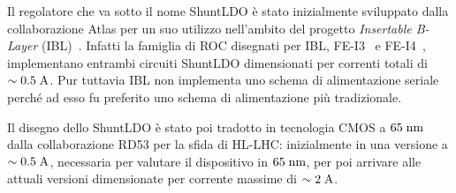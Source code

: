 
Il regolatore che va sotto il nome ShuntLDO \`e stato inizialmente sviluppato dalla collaborazione Atlas per un suo utilizzo nell'ambito del progetto {\em Insertable B-Layer} (IBL)~\cite{IBL}. Infatti la famiglia di ROC disegnati per IBL, FE-I3~\cite{ROCFEI3} e FE-I4~\cite{ROCFEI4}, implementano entrambi circuiti ShuntLDO dimensionati per correnti totali di $\sim 0.5\rm \; A$. Pur tuttavia IBL non implementa uno schema di alimentazione seriale perch\'e ad esso fu preferito uno schema di alimentazione pi\`u tradizionale.

Il disegno dello ShuntLDO \`e stato poi tradotto in tecnologia CMOS a $65\rm \; nm$ dalla collaborazione RD53 per la sfida di HL-LHC: inizialmente in una versione a $\sim 0.5\rm \; A$, necessaria per valutare il dispositivo in $65\rm \; nm$, per poi arrivare alle attuali versioni dimensionate per corrente massime di $\sim 2\rm \; A$.

